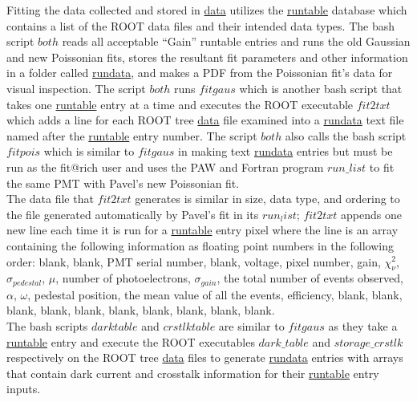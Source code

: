 \documentclass[prc,twocolumn]{revtex4}
\begin{document}
		\indent Fitting the data collected and stored in \underline{data}  utilizes the \underline{runtable} database which contains a list of the ROOT data files and their intended data types.  The bash script $both$ reads all acceptable ``Gain'' runtable entries and runs the old Gaussian and new Poissonian fits, stores the resultant fit parameters and other information in a folder called \underline{rundata}, and makes a PDF from the Poissonian fit's data for visual inspection. The script $both$ runs $fitgaus$ which is another bash script that takes one \underline{runtable} entry at a time and executes the ROOT executable $fit2txt$ which adds a line for each ROOT tree \underline{data} file examined into a \underline{rundata} text file named after the \underline{runtable} entry number. The script $both$ also calls the bash script $fitpois$ which is similar to $fitgaus$ in making text \underline{rundata} entries but must be run as the fit@rich user and uses the PAW and Fortran program $run\_list$ to fit the same PMT with Pavel's new Poissonian fit.  
		\\
		\indent The data file that $fit2txt$ generates is similar in size, data type, and ordering to the file generated automatically by Pavel's fit in its $run_list$; $fit2txt$ appends one new line each time it is run for a \underline{runtable} entry pixel where the line is an array containing the following information as floating point numbers in the following order: blank, blank, PMT serial number, blank, voltage, pixel number, gain, $\chi^{2}_{\nu}$, $\sigma_{pedestal}$, $\mu$, number of photoelectrons, $\sigma_{gain}$, the total number of events observed, $\alpha$, $\omega$, pedestal position, the mean value of all the events, efficiency, blank, blank, blank, blank, blank, blank, blank, blank, blank, blank.
		\\
		\indent The bash scripts $darktable$ and $crstlktable$ are similar to $fitgaus$ as they take a \underline{runtable} entry and execute the ROOT executables $dark\_table$ and $storage\_crstlk$ respectively on the ROOT tree \underline{data} files to generate \underline{rundata} entries with arrays that contain dark current and crosstalk information for their \underline{runtable} entry inputs.
		\\
\end{document}
